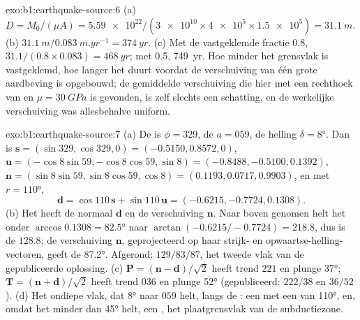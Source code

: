 \begin{solution}{exo:b1:earthquake-source:6}
(a) $D = M_0/(\mu A) = \num{5.59e22}/(\num{3e10}\times\num{4e5}\times\num{1.5e5})
= \qty{31.1}{m}$. (b) $\qty{31.1}{m}/\qty{0.083}{m.yr^{-1}} = \qty{374}{yr}$.
(c) Met de vastgeklemde fractie 0.8, $31.1/(0.8\times0.083) = \qty{468}{yr}$; met
0.5, \qty{749}{yr}. Hoe minder het grensvlak is vastgeklemd, hoe langer het duurt
voordat de verschuiving van één grote aardbeving is opgebouwd; de gemiddelde verschuiving
die hier met een rechthoek van  en $\mu = \qty{30}{GPa}$ is
gevonden, is zelf slechts een schatting, en de werkelijke verschuiving was allesbehalve
uniform.
\end{solution}

\begin{solution}{exo:b1:earthquake-source:7}
(a) De  is $\phi = 329$, de  $a = 059$, de helling $\delta =
\ang{8}$. Dan is $\mathbf s = (\sin329, \cos329, 0) = (-0.5150, 0.8572, 0)$,
$\mathbf u = (-\cos8\sin59, -\cos8\cos59, \sin8) = (-0.8488, -0.5100, 0.1392)$,
$\mathbf n = (\sin8\sin59, \sin8\cos59, \cos8) = (0.1193, 0.0717, 0.9903)$,
en met $r = \ang{110}$,
\[
  \mathbf d = \cos110\,\mathbf s + \sin110\,\mathbf u = (-0.6215, -0.7724, 0.1308) .
\]
(b) Het  heeft de normaal $\mathbf d$ en de verschuiving $\mathbf n$. Naar boven
genomen helt het onder $\arccos 0.1308 = \ang{82.5}$ naar
$\arctan(-0.6215/-0.7724) = 218.8$, dus is de  $128.8$; de verschuiving
$\mathbf n$, geprojecteerd op haar strijk- en opwaartse-helling-vectoren, geeft de 
\ang{87.2}. Afgerond: $129/83/87$, het tweede vlak van de gepubliceerde oplossing.
(c) $\mathbf P = (\mathbf n - \mathbf d)/\sqrt2$ heeft trend $221$ en plunge
\ang{37}; $\mathbf T = (\mathbf n + \mathbf d)/\sqrt2$ heeft trend $036$ en plunge
\ang{52} (gepubliceerd: $222/38$ en $36/52$). (d) Het ondiepe vlak, dat \ang{8} naar
$059$ helt, langs de : een  met een  van \ang{110},
en, omdat het minder dan \ang{45} helt, een , het plaatgrensvlak van de
subductiezone.
\end{solution}

